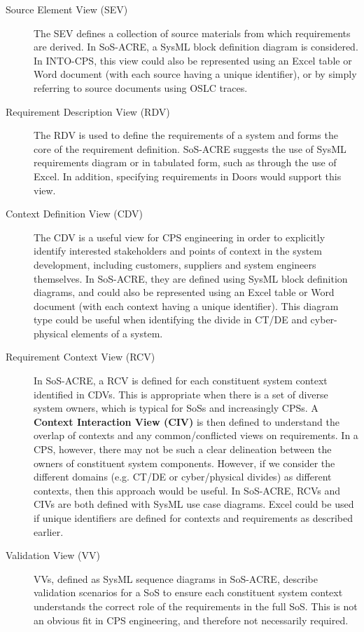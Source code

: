 \begin{description}
\item[Source Element View (SEV)] The SEV defines a collection of source materials from which requirements are derived. In SoS-ACRE, a SysML block definition diagram is considered. In INTO-CPS, this view could also be represented using an Excel table or Word document (with each source having a unique identifier), or by simply referring to source documents using OSLC traces.

\item[Requirement Description View (RDV)] The RDV is used to define the requirements of a system and forms the core of the requirement definition. SoS-ACRE suggests the use of SysML requirements diagram or in tabulated form, such as through the use of Excel. In addition, specifying requirements in  Doors would  support this view.

\item[Context Definition View (CDV)] The CDV is a useful view for CPS engineering in order to explicitly identify interested stakeholders and points of context in the system development, including customers, suppliers and system engineers themselves. In SoS-ACRE, they are defined using SysML block definition diagrams, and could also be represented using an Excel table or Word document (with each context having a unique identifier). This diagram type could be useful when identifying the divide in CT/DE and cyber-physical elements of a system.

\item[Requirement Context View (RCV)] In SoS-ACRE, a RCV is defined for each constituent system context identified in CDVs. This is appropriate when there is a set of diverse system owners, which is typical for SoSs and increasingly CPSs. A \textbf{Context Interaction View (CIV)} is then defined to understand the overlap of contexts and any common/conflicted views on requirements. In a CPS, however, there may not be such a clear delineation between the owners of constituent  system components. However, if we consider the different domains (e.g. CT/DE or cyber/physical divides) as different contexts, then this approach would be useful. In SoS-ACRE, RCVs and CIVs are both defined with SysML use case diagrams. Excel could be used if unique identifiers are defined for contexts and requirements as described earlier.

\item[Validation View (VV)] VVs, defined as SysML sequence diagrams in SoS-ACRE, describe validation scenarios for a SoS to ensure each constituent system context understands the correct role of the requirements in the full SoS. This is not an obvious fit in CPS engineering, and therefore not necessarily required.

\end{description}

